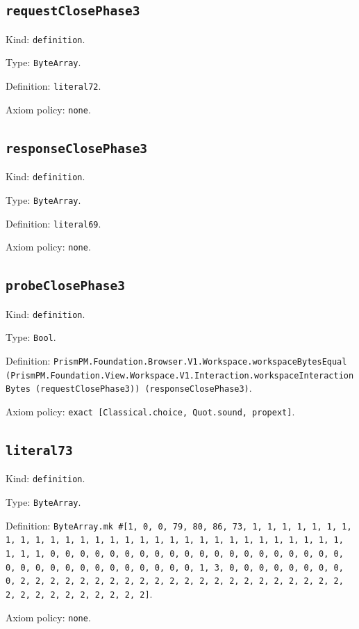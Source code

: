 \documentclass[11pt]{article}
\begin{document}
\subsection*{\texttt{requestClosePhase3}}
\noindent Kind: \texttt{definition}.\par
\noindent Type: \texttt{ByteArray}.\par
\noindent Definition: \texttt{literal72}.\par
\noindent Axiom policy: \texttt{none}.\par
\subsection*{\texttt{responseClosePhase3}}
\noindent Kind: \texttt{definition}.\par
\noindent Type: \texttt{ByteArray}.\par
\noindent Definition: \texttt{literal69}.\par
\noindent Axiom policy: \texttt{none}.\par
\subsection*{\texttt{probeClosePhase3}}
\noindent Kind: \texttt{definition}.\par
\noindent Type: \texttt{Bool}.\par
\noindent Definition: \texttt{PrismPM.Foundation.Browser.V1.Workspace.workspaceBytesEqual (PrismPM.Foundation.View.Workspace.V1.Interaction.workspaceInteractionBytes (requestClosePhase3)) (responseClosePhase3)}.\par
\noindent Axiom policy: \texttt{exact [Classical.choice, Quot.sound, propext]}.\par
\subsection*{\texttt{literal73}}
\noindent Kind: \texttt{definition}.\par
\noindent Type: \texttt{ByteArray}.\par
\noindent Definition: \texttt{ByteArray.mk \#[1, 0, 0, 79, 80, 86, 73, 1, 1, 1, 1, 1, 1, 1, 1, 1, 1, 1, 1, 1, 1, 1, 1, 1, 1, 1, 1, 1, 1, 1, 1, 1, 1, 1, 1, 1, 1, 1, 1, 1, 0, 0, 0, 0, 0, 0, 0, 0, 0, 0, 0, 0, 0, 0, 0, 0, 0, 0, 0, 0, 0, 0, 0, 0, 0, 0, 0, 0, 0, 0, 0, 0, 0, 1, 3, 0, 0, 0, 0, 0, 0, 0, 0, 0, 2, 2, 2, 2, 2, 2, 2, 2, 2, 2, 2, 2, 2, 2, 2, 2, 2, 2, 2, 2, 2, 2, 2, 2, 2, 2, 2, 2, 2, 2, 2, 2]}.\par
\noindent Axiom policy: \texttt{none}.\par
\end{document}
